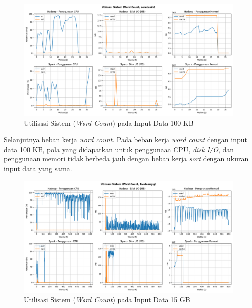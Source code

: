 \begin{figure}[h]
    \centering
    \includegraphics[width=1\textwidth]{figures/ch04/5-util-sistem-wordcount-seratuskb}
    \caption{Utilisasi Sistem (\textit{Word Count}) pada Input Data 100 KB}
    \label{fig:5-util-sistem-wordcount-seratuskb}
\end{figure}

Selanjutnya beban kerja \textit{word count}. Pada beban kerja \textit{word count} dengan input data 100 KB, pola yang didapatkan untuk penggunaan CPU, \textit{disk I/O}, dan penggunaan memori tidak berbeda jauh dengan beban kerja \textit{sort} dengan ukuran input data yang sama. 

\begin{figure}[h]
    \centering
    \includegraphics[width=1\textwidth]{figures/ch04/5-util-sistem-wordcount-fiveteengig}
    \caption{Utilisasi Sistem (\textit{Word Count}) pada Input Data 15 GB}
    \label{fig:5-util-sistem-wordcount-fiveteengig}
\end{figure}

